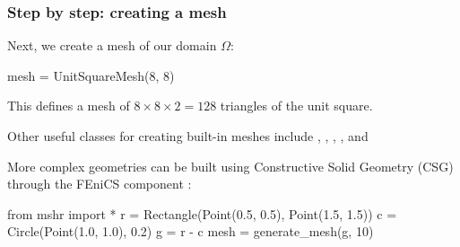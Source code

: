 \begin{frame}[fragile]
  \frametitle{Step by step: creating a mesh}

  Next, we create a mesh of our domain $\Omega$:
  \vspace{-1em}
  \begin{python}
mesh = UnitSquareMesh(8, 8)
  \end{python}
  This defines a mesh of $8 \times 8 \times 2 = 128$ triangles of the
  unit square.

  \bigskip

  Other useful classes for creating built-in meshes include
  ,
  ,
  ,
  ,
   and

  \bigskip

  More complex geometries can be built using Constructive Solid
  Geometry (CSG) through the FEniCS component :
  \vspace{-1em}
  \begin{python}
from mshr import *
r = Rectangle(Point(0.5, 0.5), Point(1.5, 1.5))
c = Circle(Point(1.0, 1.0), 0.2)
g = r - c
mesh = generate_mesh(g, 10)
  \end{python}

  \normalsize

\end{frame}
